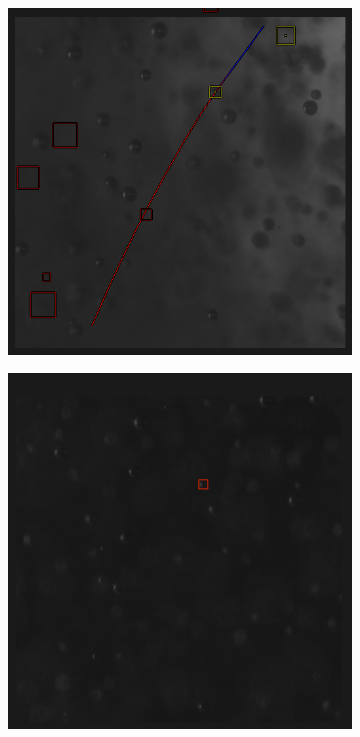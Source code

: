 \begin{figure}
				\begin{subfigure}[t]{.55\textwidth}
					\centering
					\includegraphics[scale=0.5]{images/tracking_green_2.png}
					\caption{}
					\label{subfig:green_2}
				\end{subfigure}

				\begin{subfigure}[t]{.55\textwidth}
					\centering
					\includegraphics[scale=0.5]{images/tracking_red.png}
					\caption{}
					\label{subfig:red}
				\end{subfigure}
								

\end{figure}
